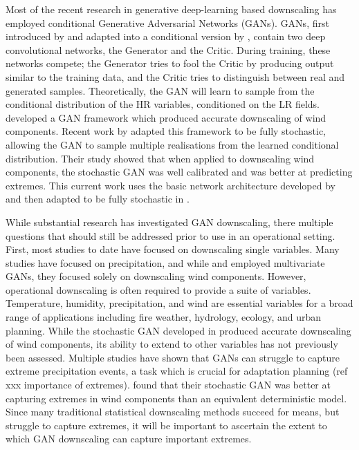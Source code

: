 \documentclass{ametsocV6.1}
\begin{document}
Most of the recent research in generative deep-learning based downscaling has employed conditional Generative Adversarial Networks (GANs). GANs, first introduced by \citet{goodfellow2014generative} and adapted into a conditional version by \citet{mirza2014conditional}, contain two deep convolutional networks, the Generator and the Critic. During training, these networks compete; the Generator tries to fool the Critic by producing output similar to the training data, and the Critic tries to distinguish between real and generated samples. Theoretically, the GAN will learn to sample from the conditional distribution of the HR variables, conditioned on the LR fields. \citet{annau2023algorithmic} developed a GAN framework which produced accurate downscaling of wind components. Recent work by \citet{daust2024capturing} adapted this framework to be fully stochastic, allowing the GAN to sample multiple realisations from the learned conditional distribution. Their study showed that when applied to downscaling wind components, the stochastic GAN was well calibrated and was better at predicting extremes. This current work uses the basic network architecture developed by \citet{annau2023algorithmic} and then adapted to be fully stochastic in \citet{daust2024capturing}. 

While substantial research has investigated GAN downscaling, there multiple questions that should still be addressed prior to use in an operational setting. First, most studies to date have focused on downscaling single variables. Many studies \citep[e.g.,][]{harris2022generative,leinonen2020stochastic,price2022increasing} have focused on precipitation, and while \citet{annau2023algorithmic} and \citet{daust2024capturing} employed multivariate GANs, they focused solely on downscaling wind components. However, operational downscaling is often required to provide a suite of variables. Temperature, humidity, precipitation, and wind are essential variables for a broad range of applications including fire weather, hydrology, ecology, and urban planning. While the stochastic GAN developed in \citet{daust2024capturing} produced accurate downscaling of wind components, its ability to extend to other variables has not previously been assessed. Multiple studies \citep{harris2022generative,leinonen2020stochastic} have shown that GANs can struggle to capture extreme precipitation events, a task which is crucial for adaptation planning (ref xxx importance of extremes). \citet{daust2024capturing} found that their stochastic GAN was better at capturing extremes in wind components than an equivalent deterministic model. Since many traditional statistical downscaling methods succeed for means, but struggle to capture extremes, it will be important to ascertain the extent to which GAN downscaling can capture important extremes. 
\end{document}
